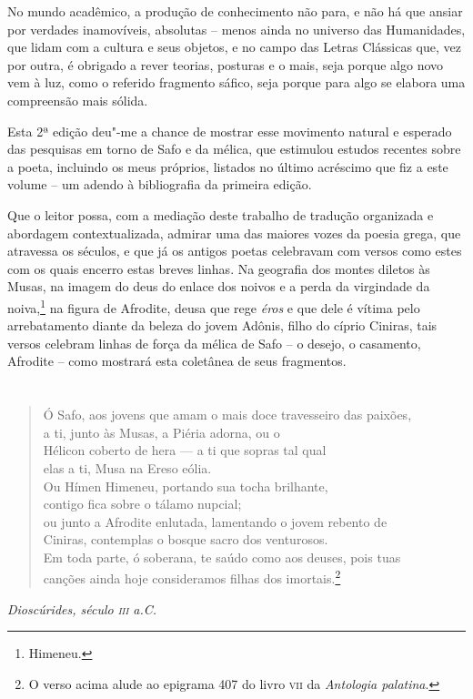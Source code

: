 No mundo acadêmico, a produção de conhecimento não para, e não há que
ansiar por verdades inamovíveis, absolutas -- menos ainda no universo
das Humanidades, que lidam com a cultura e seus objetos,
e no campo das Letras Clássicas que, vez por outra, é obrigado a rever
teorias, posturas e o mais, seja porque algo novo vem à luz, como o 
referido fragmento sáfico, seja porque para algo se elabora uma compreensão mais
sólida.

Esta 2ª edição deu"-me a chance de mostrar esse movimento natural e
esperado das pesquisas em torno de Safo e da mélica, que estimulou
estudos recentes sobre a poeta, incluindo os meus próprios, listados no
último acréscimo que fiz a este volume -- um adendo à bibliografia
da primeira edição.

Que o leitor possa, com a mediação deste trabalho de tradução organizada
e abordagem contextualizada, admirar uma das maiores vozes da poesia grega, que
atravessa os séculos, e que já os antigos poetas celebravam com versos
como estes com os quais encerro estas breves linhas.
Na geografia dos montes diletos às Musas, na imagem do deus do enlace dos noivos 
e a perda da virgindade da noiva,\footnote{Himeneu.} na figura de Afrodite, deusa 
que rege \textit{éros} e que dele é vítima pelo arrebatamento diante 
da beleza do jovem Adônis, filho do cíprio Ciniras, tais versos celebram 
linhas de força da mélica de Safo -- o desejo, o casamento, Afrodite -- como 
mostrará esta coletânea de seus fragmentos.

\pagebreak

\chapter*{}
\thispagestyle{empty}

\vspace*{\fill}
\begin{verse}
\small{Ó Safo, aos jovens que amam o mais doce travesseiro das paixões,\\
a ti, junto às Musas, a Piéria adorna, ou o\\
Hélicon coberto de hera --- a ti que sopras tal qual\\
elas a ti, Musa na Ereso eólia.\\
Ou Hímen Himeneu, portando sua tocha brilhante,\\
contigo fica sobre o tálamo nupcial;\\
ou junto a Afrodite enlutada, lamentando o jovem rebento de\\
Ciniras, contemplas o bosque sacro dos venturosos.\\
Em toda parte, ó soberana, te saúdo como aos deuses, pois tuas\\
canções ainda hoje consideramos filhas dos imortais.}\footnote{O verso acima alude ao epigrama 407 do livro \textsc{vii} da \textit{Antologia palatina}.}
\end{verse}

\begin{flushright}
\small{\textit{Dioscúrides, século \textsc{iii} a.C.}}
\end{flushright}
